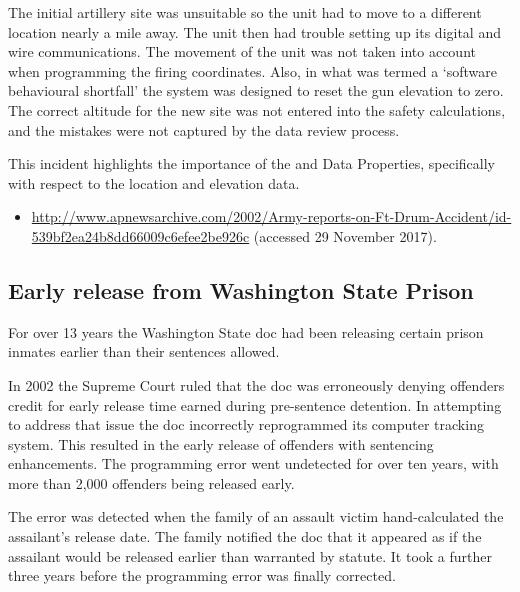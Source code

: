 The initial artillery site was unsuitable so the unit had to move to a different location nearly a mile away. The unit then had trouble setting up its digital and wire communications. The movement of the unit was not taken into account when programming the firing coordinates. Also, in what was termed a `software behavioural shortfall' the system was designed to reset the gun elevation to zero. The correct altitude for the new site was not entered into the safety calculations, and the mistakes were not captured by the data review process.

This incident highlights the importance of the  and  Data Properties, specifically with respect to the location and elevation data.

\begin{itemize}
	\item \raggedright{\href{http://www.apnewsarchive.com/2002/Army-reports-on-Ft-Drum-Accident/id-539bf2ea24b8dd66009c6efee2be926c}{http://www.apnewsarchive.com/2002/Army-reports-on-Ft-Drum-Accident/id- 539bf2ea24b8dd66009c6efee2be926c} (accessed 29 November 2017).}
\end{itemize}


\subsection{Early release from Washington State Prison} \label{bkm:incacc:washprison}
For over 13 years the Washington State \gls{doc} had been releasing certain prison inmates earlier than their sentences allowed.

In 2002 the Supreme Court ruled that the \gls{doc} was erroneously denying offenders credit for early release time earned during pre-sentence detention. In attempting to address that issue the \gls{doc} incorrectly reprogrammed its computer tracking system. This resulted in the early release of offenders with sentencing enhancements. The programming error went undetected for over ten years, with more than 2,000 offenders being released early.

The error was detected when the family of an assault victim hand-calculated the assailant's release date. The family notified the \gls{doc} that it appeared as if the assailant would be released earlier than warranted by statute. It took a further three years before the programming error was finally corrected.

